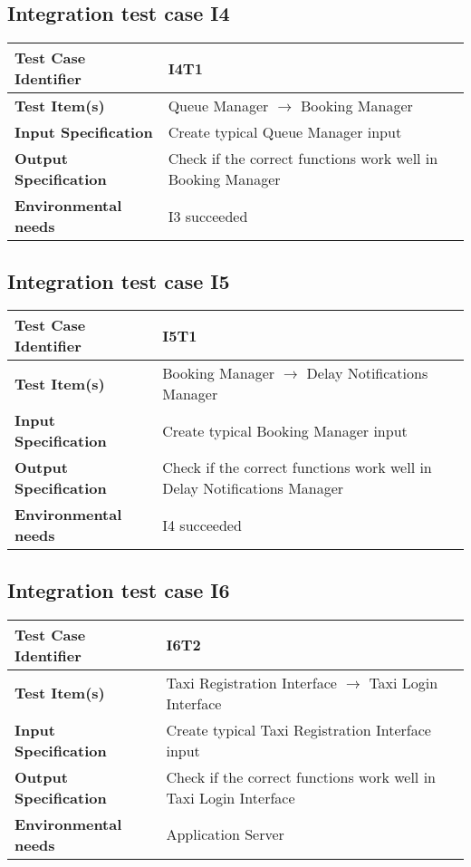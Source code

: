 \subsection{Integration test case I4}
\begin{tabular} {l p{9cm}}
	\hline \textbf{Test Case Identifier} & I4T1 \\
	\hline \textbf{Test Item(s)} & Queue Manager $\rightarrow$ Booking Manager \\
	\hline \textbf{Input Specification} & Create typical Queue Manager input \\
	\hline \textbf{Output Specification} & Check if the correct functions work well in Booking Manager \\
	\hline \textbf{Environmental needs} & I3 succeeded \\
	\hline 
\end{tabular}
\subsection{Integration test case I5}
\begin{tabular} {l p{9cm}}
	\hline \textbf{Test Case Identifier} & I5T1 \\
	\hline \textbf{Test Item(s)} & Booking Manager $\rightarrow$ Delay Notifications Manager \\
	\hline \textbf{Input Specification} & Create typical Booking Manager input \\
	\hline \textbf{Output Specification} & Check if the correct functions work well in Delay Notifications Manager \\
	\hline \textbf{Environmental needs} & I4 succeeded \\
	\hline 
\end{tabular}
\subsection{Integration test case I6}
\begin{tabular} {l p{9cm}}
	\hline \textbf{Test Case Identifier} & I6T2 \\
	\hline \textbf{Test Item(s)} & Taxi Registration Interface $\rightarrow$ Taxi Login Interface \\
	\hline \textbf{Input Specification} & Create typical Taxi Registration Interface input \\
	\hline \textbf{Output Specification} & Check if the correct functions work well in Taxi Login Interface \\
	\hline \textbf{Environmental needs} & Application Server \\
	\hline 
\end{tabular}
